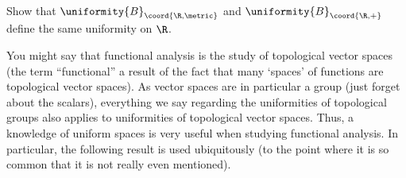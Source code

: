 \begin{exr}{}{}
Show that $\uniformity{B}_{\coord{\R ,\metric}}$ and $\uniformity{B}_{\coord{\R ,+}}$ define the same uniformity on $\R$.
\end{exr}

You might say that functional analysis is the study of topological vector spaces (the term ``functional'' a result of the fact that many `spaces' of functions are topological vector spaces).  As vector spaces are in particular a group (just forget about the scalars), everything we say regarding the uniformities of topological groups also applies to uniformities of topological vector spaces.  Thus, a knowledge of uniform spaces is very useful when studying functional analysis.  In particular, the following result is used ubiquitously (to the point where it is so common that it is not really even mentioned).
